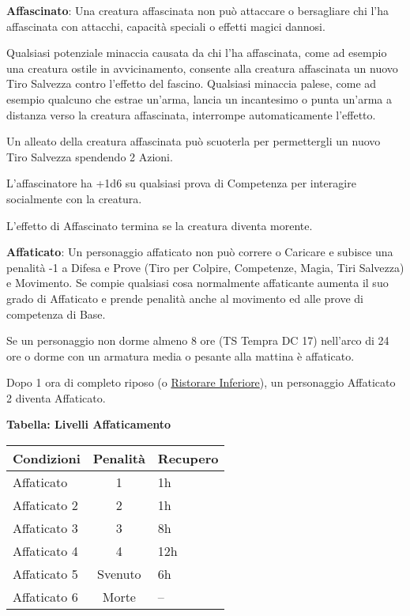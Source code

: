\begin{multicols}{2}
\textbf{Affascinato}: Una creatura affascinata non può attaccare o bersagliare chi l'ha affascinata con attacchi, capacità speciali o effetti magici dannosi.

Qualsiasi potenziale minaccia causata da chi l'ha affascinata, come ad esempio una creatura ostile in avvicinamento, consente alla creatura affascinata un nuovo Tiro Salvezza contro l'effetto del fascino. Qualsiasi minaccia palese, come ad esempio qualcuno che estrae un'arma, lancia un incantesimo o punta un'arma a distanza verso la creatura affascinata, interrompe automaticamente l'effetto.

Un alleato della creatura affascinata può scuoterla per permettergli un nuovo Tiro Salvezza spendendo 2 Azioni.

L'affascinatore ha +1d6 su qualsiasi prova di Competenza per interagire socialmente con la creatura.

L'effetto di Affascinato termina se la creatura diventa morente.

\textbf{Affaticato}\hypertarget{affaticato}{}\label{affaticato}: Un personaggio affaticato non può correre o Caricare e subisce una penalità -1 a Difesa e Prove (Tiro per Colpire, Competenze, Magia, Tiri Salvezza) e Movimento. Se compie qualsiasi cosa normalmente affaticante aumenta il suo grado di Affaticato e prende penalità anche al movimento ed alle prove di competenza di Base.

Se un personaggio non dorme almeno 8 ore (TS Tempra DC 17) nell'arco di 24 ore o dorme con un armatura media o pesante alla mattina è affaticato.

Dopo 1 ora di completo riposo (o \hyperlink{Ristorare Inferiore}{Ristorare Inferiore}), un personaggio Affaticato 2 diventa Affaticato.

\medskip

\textbf{Tabella: Livelli Affaticamento}

\medskip

\noindent\begin{tabularx}{0.45\textwidth}{lcl}
\textbf{Condizioni}& \textbf{Penalità}&\textbf{Recupero}\\
\hline
Affaticato 		&	1 		&	1h\\
Affaticato 2	&	2		&	1h\\
Affaticato 3	&	3		&	8h\\
Affaticato 4	&	4		&	12h\\
Affaticato 5	&	Svenuto	&	6h\\
Affaticato 6	&	Morte	&	--
\end{tabularx}


\end{multicols}
